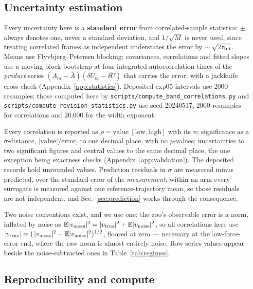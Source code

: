\documentclass[aip,jcp,reprint,amsmath,amssymb,floatfix]{revtex4-2}
\newcommand{\dU}{\ensuremath{\delta U}}
\begin{document}
\subsection{Uncertainty estimation}
\label{sec:uncertainty}

Every uncertainty here is a \textbf{standard error} from correlated-sample
statistics: $\pm$ always denotes one, never a standard deviation,
and $1/\sqrt{M}$ is never used, since treating correlated frames as
independent understates the error by $\sim\sqrt{2\tau_{\rm int}}$.
Means use Flyvbjerg--Petersen blocking\cite{Flyvbjerg1989}; covariances,
correlations and fitted slopes use a moving-block
bootstrap\cite{Kunsch1989, PolitisRomano1994}
at four integrated autocorrelation times of the
\emph{product} series $(A_m - \bar A)(\dU_m - \overline{\dU})$ that carries the
error, with a jackknife cross-check
(Appendix~\ref{app:statistics}). Deposited exp05 intervals use 2000 resamples;
those computed here by
\texttt{scripts/compute\_band\_correlations.py} and
\texttt{scripts/compute\_revision\_statistics.py} use seed 20240517, 2000
resamples for correlations and 20{,}000 for the width exponent.

Every correlation is reported as $\rho = \text{value}\;[\text{low},
\text{high}]$ with its $n$; significance as a $\sigma$-distance,
$|\text{value}|/\text{error}$, to one decimal place, with no $p$-values;
uncertainties to two significant figures and central values to the same decimal
place, the one exception being exactness checks
(Appendix~\ref{app:validation}). The deposited records hold unrounded values.
Prediction residuals in $\sigma$ are measured minus predicted, over
the standard error of the \emph{measurement}; within an arm every surrogate
is measured against one reference-trajectory mean, so those residuals are
not independent, and Sec.~\ref{sec:prediction} works through the consequence.

Two noise conventions exist, and we use one: the zoo's observable error is a
norm, inflated by noise as $\mathbb{E}|v_{\rm meas}|^2 =
|v_{\rm true}|^2 + \mathbb{E}|v_{\rm noise}|^2$, so all correlations here
use $|v_{\rm true}| = (\,|v_{\rm meas}|^2 -
\mathbb{E}|v_{\rm noise}|^2)^{1/2}$, floored at zero --- necessary at the
low-force-error end, where the raw norm is almost entirely noise. Raw-series
values appear beside the noise-subtracted ones in Table~\ref{tab:regimes}.

\subsection{Reproducibility and compute}
\end{document}
